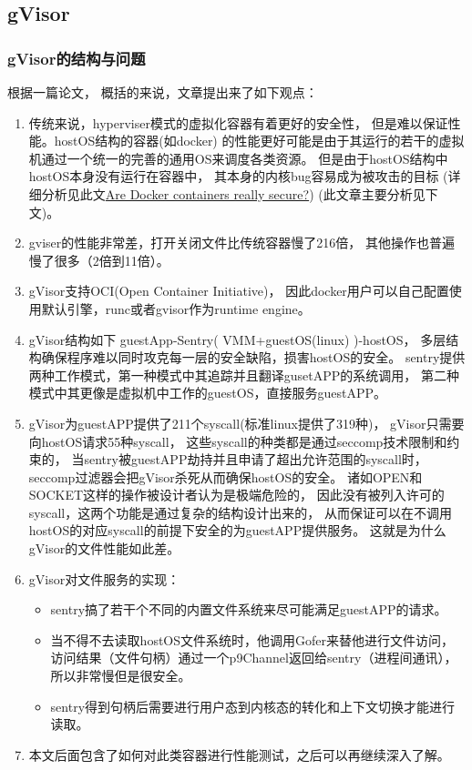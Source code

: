 \documentclass[AutoFakeBold,a4paper]{ctexart}
\begin{document}
\subsection{gVisor}

\subsubsection{gVisor的结构与问题}

根据一篇论文\cite{234857}，
概括的来说，文章提出来了如下观点：

\begin{enumerate}
    \item 传统来说，hyperviser模式的虚拟化容器有着更好的安全性，
    但是难以保证性能。hostOS结构的容器(如docker)
    的性能更好可能是由于其运行的若干的虚拟机通过一个统一的完善的通用OS来调度各类资源。
    但是由于hostOS结构中hostOS本身没有运行在容器中，
    其本身的内核bug容易成为被攻击的目标 
    (详细分析见此文\href{https://opensource.com/business/14/7/docker-security-selinux}
    {Are Docker containers really secure?}\cite{DanielJDocker}) 
    (此文章主要分析见下文)。
    \item gviser的性能非常差，打开关闭文件比传统容器慢了216倍，
    其他操作也普遍慢了很多（2倍到11倍）。
    \item gVisor支持OCI(Open Container Initiative)，
    因此docker用户可以自己配置使用默认引擎，runc或者gvisor作为runtime engine。
    \item gVisor结构如下 guestApp-Sentry( VMM+guestOS(linux) )-hostOS，
    多层结构确保程序难以同时攻克每一层的安全缺陷，损害hostOS的安全。
    sentry提供两种工作模式，第一种模式中其追踪并且翻译gusetAPP的系统调用，
    第二种模式中其更像是虚拟机中工作的guestOS，直接服务guestAPP。
    \item gVisor为guestAPP提供了211个syscall(标准linux提供了319种)，
    gVisor只需要向hostOS请求55种syscall，
    这些syscall的种类都是通过seccomp技术限制和约束的，
    当sentry被guestAPP劫持并且申请了超出允许范围的syscall时，
    seccomp过滤器会把gVisor杀死从而确保hostOS的安全。
    诸如OPEN和SOCKET这样的操作被设计者认为是极端危险的，
    因此没有被列入许可的syscall，这两个功能是通过复杂的结构设计出来的，
    从而保证可以在不调用hostOS的对应syscall的前提下安全的为guestAPP提供服务。
    这就是为什么gVisor的文件性能如此差。
    \item gVisor对文件服务的实现：
    \begin{itemize}
        \item sentry搞了若干个不同的内置文件系统来尽可能满足guestAPP的请求。
        \item 当不得不去读取hostOS文件系统时，他调用Gofer来替他进行文件访问，
        访问结果（文件句柄）通过一个p9Channel返回给sentry（进程间通讯），
        所以非常慢但是很安全。
        \item sentry得到句柄后需要进行用户态到内核态的转化和上下文切换才能进行读取。
    \end{itemize}
    
    \item 本文后面包含了如何对此类容器进行性能测试，之后可以再继续深入了解。
\end{enumerate}
\end{document}
